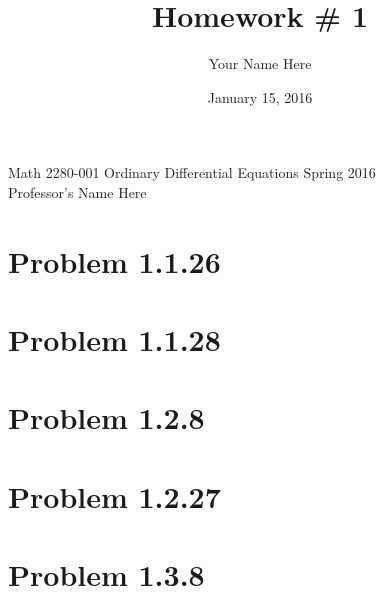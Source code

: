 \documentclass[12pt, letterpaper]{article}
\title{Homework \# 1}
\author{Your Name Here}
\date{January 15, 2016}
\begin{document}
\begin{titlepage}
\clearpage\maketitle
\centering
\vspace{2.5cm}
Math 2280-001 \qquad Ordinary Differential Equations \qquad Spring 2016\\
\vspace{0.5cm}
Professor's Name Here
\thispagestyle{empty}
\end{titlepage}

\section{Problem 1.1.26}

\section{Problem 1.1.28}

\section{Problem 1.2.8}

\section{Problem 1.2.27}

\section{Problem 1.3.8}
\end{document}
